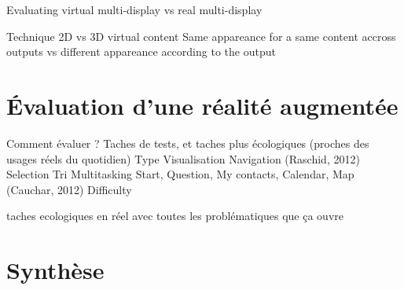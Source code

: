        Evaluating virtual multi-display vs real multi-display 

        Technique 
            2D vs 3D virtual content \cite{JansenDragicevicFekete2013} \cite{SerranoHildebrandtSubramanianEtAl2014}
            Same appareance for a same content accross outputs vs different appareance according to the output \cite{GrubertHeinischQuigleyEtAl2015} 


\section*{Évaluation d'une réalité augmentée}
Comment évaluer ? Taches de tests, et taches plus écologiques (proches des usages réels du quotidien) \cite{DuenserGrassetBillinghurst2008} \cite{DeSaChurchill2013}
    Type
        Visualisation 
        Navigation \cite{EnsFinneganIrani2014} (Raschid, 2012) 
        Selection \cite{EnsFinneganIrani2014}
        Tri \cite{RobertsonCzerwinskiLarsonEtAl1998}
        Multitasking 
            Start, Question, My contacts, Calendar, Map (Cauchar, 2012) \cite{EnsFinneganIrani2014} 
    Difficulty

    taches ecologiques en réel avec toutes les problématiques que ça ouvre \cite{KoelleKranzMoeller2015} \cite{DenningDehlawiKohno2014}


\section*{Synthèse}